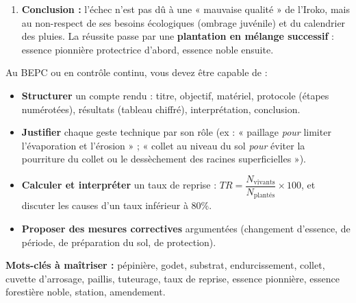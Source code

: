 \documentclass[11pt]{article}
\begin{document}
\begin{exoresolu}
\begin{enumerate}
\begin{enumerate}
        \item \textbf{Suivi :} éclaircir progressivement le \textit{Gliricidia} (taille) au fur et à mesure de la croissance de l'Iroko.
    \end{enumerate}
    \item \textbf{Conclusion :} l'échec n'est pas dû à une « mauvaise qualité » de l'Iroko, mais au non-respect de ses besoins écologiques (ombrage juvénile) et du calendrier des pluies. La réussite passe par une \textbf{plantation en mélange successif} : essence pionnière protectrice d'abord, essence noble ensuite.
\end{enumerate}
\end{exoresolu}

\begin{aretenir}
Au BEPC ou en contrôle continu, vous devez être capable de :
\begin{itemize}
    \item \textbf{Structurer} un compte rendu : titre, objectif, matériel, protocole (étapes numérotées), résultats (tableau chiffré), interprétation, conclusion.
    \item \textbf{Justifier} chaque geste technique par son rôle (ex : « paillage \textit{pour} limiter l'évaporation et l'érosion » ; « collet au niveau du sol \textit{pour} éviter la pourriture du collet ou le dessèchement des racines superficielles »).
    \item \textbf{Calculer et interpréter} un taux de reprise : $TR = \dfrac{N_{\text{vivants}}}{N_{\text{plantés}}} \times 100$, et discuter les causes d'un taux inférieur à 80\%.
    \item \textbf{Proposer des mesures correctives} argumentées (changement d'essence, de période, de préparation du sol, de protection).
\end{itemize}
\textbf{Mots-clés à maîtriser :} pépinière, godet, substrat, endurcissement, collet, cuvette d'arrosage, paillis, tuteurage, taux de reprise, essence pionnière, essence forestière noble, station, amendement.
\end{aretenir}
\end{document}
